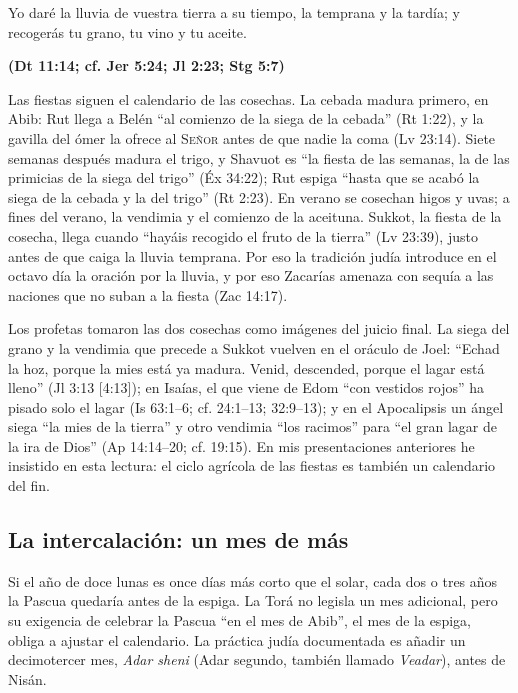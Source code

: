 \documentclass[11pt,letterpaper]{article}
\newcommand{\SENOR}{\textsc{Señor}}
\newcommand{\fuente}[1]{\par\hfill{\upshape\bfseries\small\textcolor{tierraroja}{#1}}}
\begin{document}
\begin{cita}Yo daré la lluvia de vuestra tierra a su tiempo, la temprana y la tardía; y recogerás tu grano, tu vino y tu aceite.\fuente{(Dt 11:14; cf. Jer 5:24; Jl 2:23; Stg 5:7)}\end{cita}

Las fiestas siguen el calendario de las cosechas. La cebada madura primero, en Abib: Rut llega a Belén ``al comienzo de la siega de la cebada'' (Rt 1:22), y la gavilla del ómer la ofrece al \SENOR{} antes de que nadie la coma (Lv 23:14). Siete semanas después madura el trigo, y Shavuot es ``la fiesta de las semanas, la de las primicias de la siega del trigo'' (Éx 34:22); Rut espiga ``hasta que se acabó la siega de la cebada y la del trigo'' (Rt 2:23). En verano se cosechan higos y uvas; a fines del verano, la vendimia y el comienzo de la aceituna. Sukkot, la fiesta de la cosecha, llega cuando ``hayáis recogido el fruto de la tierra'' (Lv 23:39), justo antes de que caiga la lluvia temprana. Por eso la tradición judía introduce en el octavo día la oración por la lluvia, y por eso Zacarías amenaza con sequía a las naciones que no suban a la fiesta (Zac 14:17).

Los profetas tomaron las dos cosechas como imágenes del juicio final. La siega del grano y la vendimia que precede a Sukkot vuelven en el oráculo de Joel: ``Echad la hoz, porque la mies está ya madura. Venid, descended, porque el lagar está lleno'' (Jl 3:13 [4:13]); en Isaías, el que viene de Edom ``con vestidos rojos'' ha pisado solo el lagar (Is 63:1--6; cf. 24:1--13; 32:9--13); y en el Apocalipsis un ángel siega ``la mies de la tierra'' y otro vendimia ``los racimos'' para ``el gran lagar de la ira de Dios'' (Ap 14:14--20; cf. 19:15). En mis presentaciones anteriores he insistido en esta lectura: el ciclo agrícola de las fiestas es también un calendario del fin.

\subsection{La intercalación: un mes de más}
Si el año de doce lunas es once días más corto que el solar, cada dos o tres años la Pascua quedaría antes de la espiga. La Torá no legisla un mes adicional, pero su exigencia de celebrar la Pascua ``en el mes de Abib'', el mes de la espiga, obliga a ajustar el calendario. La práctica judía documentada es añadir un decimotercer mes, \emph{Adar sheni} (Adar segundo, también llamado \emph{Veadar}), antes de Nisán.
\end{document}
